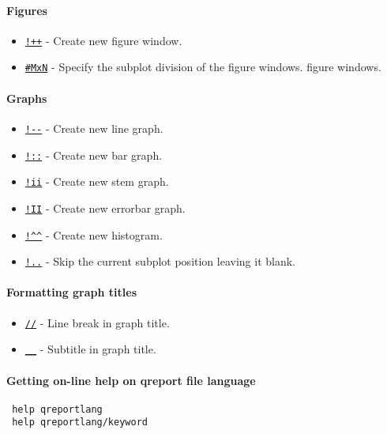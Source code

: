 

	\paragraph{Figures}
 
 \begin{itemize}
 \item
   \href{qreportlang/figure}{\texttt{!++}} - Create new figure window.
 \item
   \href{qreportlang/subplot}{\texttt{\#MxN}} - Specify the subplot
   division of the figure windows. figure windows.
 \end{itemize}
 
 \paragraph{Graphs}
 
 \begin{itemize}
 \item
   \href{qreportlang/linegraph}{\texttt{!-{}-}} - Create new line graph.
 \item
   \href{qreportlang/bargraph}{\texttt{!::}} - Create new bar graph.
 \item
   \href{qreportlang/stemgraph}{\texttt{!ii}} - Create new stem graph.
 \item
   \href{qreportlang/errorbargraph}{\texttt{!II}} - Create new errorbar
   graph.
 \item
   \href{qreportlang/histgraph}{\texttt{!\^{}\^{}}} - Create new
   histogram.
 \item
   \href{qreportlang/blank}{\texttt{!..}} - Skip the current subplot
   position leaving it blank.
 \end{itemize}
 
 \paragraph{Formatting graph titles}
 
 \begin{itemize}
 \item
   \href{qreportlang/linebreak}{\texttt{//}} - Line break in graph title.
 \item
   \href{qreportlang/subtitle}{\texttt{\_\_}} - Subtitle in graph title.
 \end{itemize}
 
 \paragraph{Getting on-line help on qreport file language}
 
 \begin{verbatim}
 help qreportlang
 help qreportlang/keyword
 \end{verbatim}



